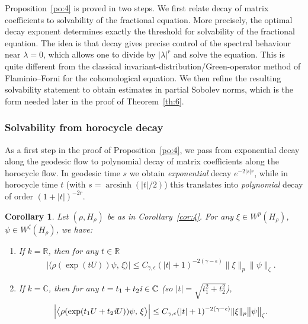 \documentclass[11 pt]{amsart}
\newcommand{\RR}{\mathbb{R}}
\newcommand{\CC}{\mathbb{C}}
\newtheorem{corollary}[theorem]{Corollary}
\theoremstyle{definition}
\numberwithin{equation}{section}
\begin{document}
Proposition~\ref{po:4} is proved in two steps. We first relate decay of
matrix coefficients to solvability of the fractional equation. More
precisely, the optimal decay exponent determines exactly the threshold
for solvability of the fractional equation. The idea is that decay gives
precise control of the spectral behaviour near \(\lambda=0\), which
allows one to divide by \( |\lambda|^r \) and solve the equation. This
is quite different from the classical invariant-distribution/Green-operator
method of Flaminio--Forni for the cohomological equation. We then refine the resulting solvability statement to obtain estimates in
partial Sobolev norms, which is the form needed later in the proof of
Theorem~\ref{th:6}.




\subsubsection{Solvability from horocycle decay} As a first step in the proof of Proposition~\ref{po:4}, we pass from
exponential decay along the geodesic flow to polynomial decay of matrix
coefficients along the horocycle flow. In geodesic time $s$ we obtain
\emph{exponential} decay $e^{-2|s|r}$, while in horocycle time $t$ (with
$s=\operatorname{arcsinh}(|t|/2)$) this translates into \emph{polynomial}
decay of order $(1+|t|)^{-2r}$.



\begin{corollary}\label{cor:5} Let $(\rho,H_\rho)$ be as in Corollary~\ref{cor:4}.
For any $\xi\in W^{p}(H_\rho)$, $\psi\in W^{\zeta}(H_\rho)$, we have:
\begin{enumerate}
  \item If $k=\RR$, then for any $t\in\RR$
  \begin{align*}
\Big|\big\langle \rho(\exp(tU))\psi,\, \xi\big\rangle \Big|\leq C_{\gamma,\epsilon}(|t|+1)^{-2(\gamma-\epsilon)}  \| \xi \|_{p} \big\|\psi\big\|_{\zeta}.
\end{align*}
  \item If $k=\CC$, then for any $t=t_1+t_2 \emph{i}\in\CC$ (so
        $|t|=\sqrt{t_1^2+t_2^2}$),
  \begin{align*}
\Big|\big\langle \rho(\exp(t_1U+t_2 \emph{i}U))\psi,\, \xi\big\rangle \Big|\leq C_{\gamma,\epsilon}(|t|+1)^{-2(\gamma-\epsilon)}  \| \xi \|_{p} \big\|\psi\big\|_{\zeta}.
\end{align*}
\end{enumerate}




\end{corollary}
\end{document}
